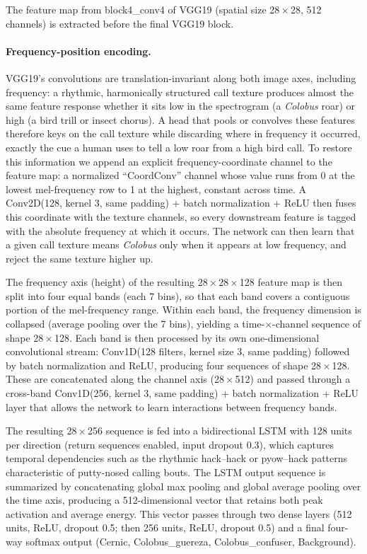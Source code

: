 \documentclass[final,3p,times]{elsarticle}
\begin{document}
The feature map from block4\_conv4 of VGG19 (spatial size
28\,$\times$\,28, 512 channels) is extracted before the final VGG19 block.

\paragraph{Frequency-position encoding.}
VGG19's convolutions are translation-invariant along both image axes, including
frequency: a rhythmic, harmonically structured call texture produces almost the
same feature response whether it sits low in the spectrogram (a \textit{Colobus}
roar) or high (a bird trill or insect chorus). A head that pools or convolves
these features therefore keys on the call texture while discarding
where in frequency it occurred, exactly the cue a human uses to tell a
low roar from a high bird call. To restore this information we append an
explicit frequency-coordinate channel to the feature map: a normalized
``CoordConv'' channel \cite{liu2018} whose value runs from 0 at the lowest
mel-frequency row to 1 at the highest, constant across time. A
Conv2D(128, kernel 3, same padding) + batch normalization + ReLU then fuses this
coordinate with the texture channels, so every downstream feature is tagged with
the absolute frequency at which it occurs. The network can then learn that a
given call texture means \textit{Colobus} only when it appears at low frequency,
and reject the same texture higher up.

The frequency axis (height) of the resulting 28\,$\times$\,28\,$\times$\,128
feature map is then split into four equal bands (each 7 bins), so that
each band covers a contiguous portion of the mel-frequency range. Within each
band, the frequency dimension is collapsed (average pooling over the 7 bins),
yielding a time-$\times$-channel sequence of shape 28\,$\times$\,128. Each
band is then processed by its own one-dimensional convolutional stream:
Conv1D(128 filters, kernel size 3, same padding) followed by batch
normalization and ReLU, producing four sequences of shape
28\,$\times$\,128. These are concatenated along the channel axis
(28\,$\times$\,512) and passed through a cross-band Conv1D(256, kernel 3,
same padding) + batch normalization + ReLU layer that allows the network to
learn interactions between frequency bands.

The resulting 28\,$\times$\,256 sequence is fed into a bidirectional LSTM with
128 units per direction (return sequences enabled, input dropout 0.3),
which captures temporal dependencies such as the rhythmic hack--hack or
pyow--hack patterns characteristic of putty-nosed calling bouts. The LSTM
output sequence is summarized by concatenating global max pooling and global
average pooling over the time axis, producing a 512-dimensional vector that
retains both peak activation and average energy. This vector passes through
two dense layers (512 units, ReLU, dropout 0.5; then 256 units, ReLU, dropout
0.5) and a final four-way softmax output (Cernic, Colobus\_guereza,
Colobus\_confuser, Background).
\end{document}
